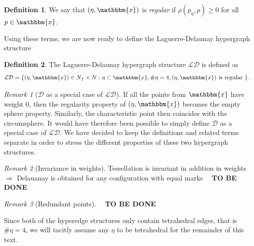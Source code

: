 \documentclass[12pt,a4paper]{article}
\theoremstyle{definition}
\newtheorem{definition}{Definition}
\theoremstyle{remark}
\newtheorem{remark}{Remark}
\theoremstyle{theorem}
\newcommand{\tbd}{\textbf{{\color{red}~ TO BE DONE ~}}}
\newcommand{\x}{\mathbbm{x}}
\begin{document}

\begin{definition}
We say that $(\eta,\x)$ is \textit{regular} if $\rho(p_\eta,p)\geq 0 $ for all $p \in \x$.
\end{definition}


Using these terms, we are now ready to define the Laguerre-Delaunay hypergraph structure

\begin{definition}
	The Laguerre-Delaunay hypergraph structure $\mathcal {LD}$ is defined as 
	$$\mathcal {LD} = \left\{ (\eta,\x) \in N_f \times N: \eta \subset \x, \# \eta = 4, (\eta,\x) \text{ is regular } \right\}.$$
\end{definition}


\begin{remark}[$\mathcal D$ as a special case of $\mathcal {LD}$] If all the points from $\x$ have weight 0, then the regularity property of $(\eta, \x)$ becomes the empty sphere property. Similarly, the characteristic point then coincides with the circumsphere. It would have therefore been possible to simply define $\mathcal D$ as a special case of $\mathcal {LD}$. We have decided to keep the definitions and related terms separate in order to stress the different properties of these two hypergraph structures. 
\end{remark}


\begin{remark}[Invariance in weights] \label{r:invariance} Tessellation is invariant in addition in weights $\Rightarrow$ Delauanay is obtained for any configuration with equal marks \tbd
\end{remark}

\begin{remark}[Redundant points]
	\tbd
\end{remark}

Since both of the hyperedge structures only contain tetrahedral edges, that is $\# \eta = 4$, we will tacitly assume any $\eta$ to be tetrahedral for the remainder of this text. 
\end{document}
